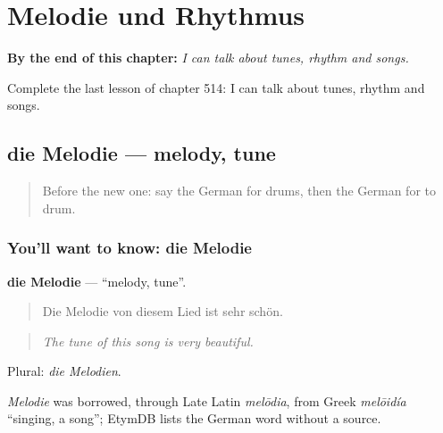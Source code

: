 
\chapter{Melodie und Rhythmus}
\label{ch:ge-melodie-und-rhythmus}

\begin{chapteropening}
\textbf{By the end of this chapter:} \emph{I can talk about tunes, rhythm and songs.}

Complete the last lesson of chapter 514: I can talk about tunes, rhythm and songs.
\end{chapteropening}

\section[die Melodie]{die Melodie — melody, tune}

\label{lesson:GE-C514-melodie}



\begin{quote}
Before the new one: say the German for drums, then the German for to drum.
\end{quote}

\subsection*{You'll want to know: die Melodie}
\textbf{die Melodie} — \textquotedblleft{}melody, tune\textquotedblright{}.

\begin{quote}
Die Melodie von diesem Lied ist sehr schön.
\end{quote}

\begin{quote}
\emph{The tune of this song is very beautiful.}
\end{quote}

Plural: \emph{die Melodien}.

\begin{cousinweb}
\emph{Melodie} was borrowed, through Late Latin \emph{melōdia}, from Greek \emph{melōidía} \textquotedblleft{}singing, a song\textquotedblright{}; EtymDB lists the German word without a source.
\end{cousinweb}

